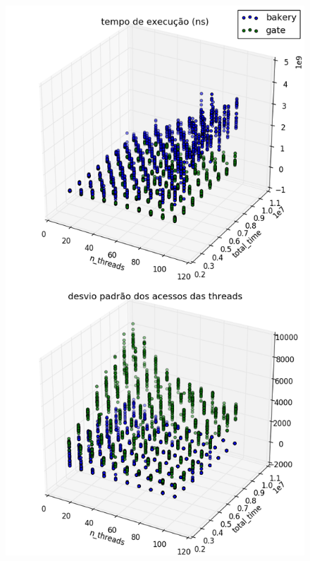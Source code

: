 \documentclass[10pt,twocolumn]{article}
\begin{document}
\begin{figure}
  \includegraphics[width=\linewidth]{figure_1.png}
\end{figure}
\end{document}
